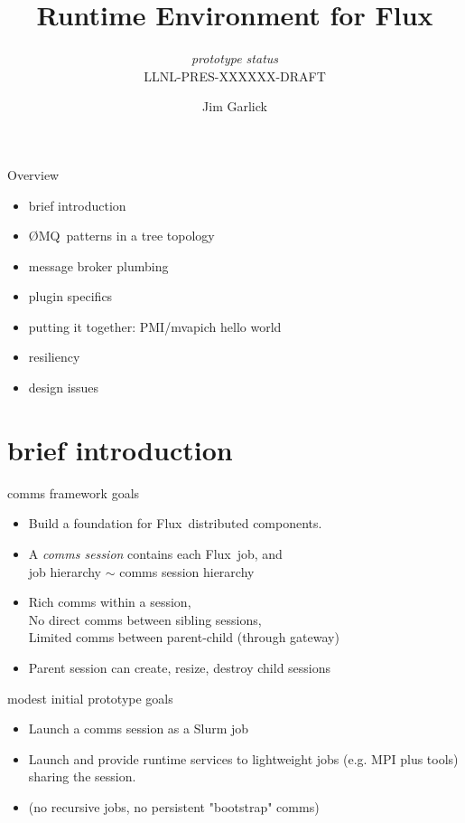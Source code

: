 \documentclass[default,pdf,colorBG,slideColor]{prosper}
\title{Runtime Environment for Flux}
\subtitle{{\small {\em prototype status}\\
LLNL-PRES-XXXXXX-DRAFT}}
\author{Jim Garlick}
\newcommand{\ngrm}{Flux}
\newcommand{\zMQ}{\O{}MQ}
\begin{document}
\maketitle

\begin{slide}{Overview}{\small
\begin{itemize}
  \item{brief introduction}
  \item{\zMQ\ patterns in a tree topology}
  \item{message broker plumbing}
  \item{plugin specifics}
  \item{putting it together: PMI/mvapich hello world}
  \item{resiliency}
  \item{design issues}
\end{itemize}
}\end{slide}

\part{brief introduction}

\begin{slide}{comms framework goals}{\small
\begin{itemize}
  \item{Build a foundation for \ngrm\ distributed components.}
  \item{A {\em comms session} contains each \ngrm\ job, and \\
	job hierarchy $\sim$ comms session hierarchy}
  \item{Rich comms within a session,\\
	No direct comms between sibling sessions,\\
        Limited comms between parent-child (through gateway)}
  \item{Parent session can create, resize, destroy child sessions}
\end{itemize}
}\end{slide}

\begin{slide}{modest initial prototype goals}{\small
\begin{itemize}
  \item{Launch a comms session as a Slurm job}
  \item{Launch and provide runtime services to
        lightweight jobs (e.g. MPI plus tools) sharing the session.}
  \item{(no recursive jobs, no persistent "bootstrap" comms)}
\end{itemize}
}\end{slide}
\end{document}
